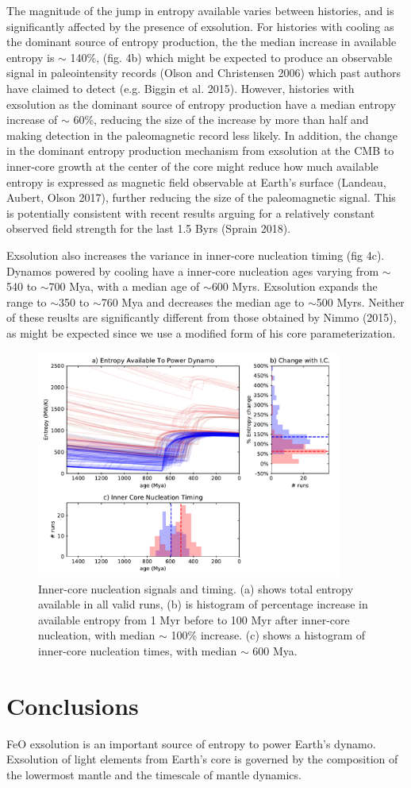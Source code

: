 \documentclass[]{article}
\begin{document}
	The magnitude of the jump in entropy available varies between histories, and is significantly affected by the presence of exsolution. For histories with cooling as the dominant source of entropy production, the the median increase in available entropy is $\sim$ 140\%, (fig. 4b) which might be expected to produce an observable signal in paleointensity records (Olson and Christensen 2006) which past authors have claimed to detect (e.g. Biggin et al. 2015). However, histories with exsolution as the dominant source of entropy production have a median entropy increase of $\sim$ 60\%, reducing the size of the increase by more than half and making detection in the paleomagnetic record less likely. In addition, the change in the dominant entropy production mechanism from exsolution at the CMB to inner-core growth at the center of the core might reduce how much available entropy is expressed as magnetic field observable at Earth's surface (Landeau, Aubert, Olson 2017), further reducing the size of the paleomagnetic signal. This is potentially consistent with recent results arguing for a relatively constant observed field strength for the last 1.5 Byrs (Sprain 2018). 
	
	Exsolution also increases the variance in inner-core nucleation timing (fig 4c). Dynamos powered by cooling have a inner-core nucleation ages varying from $\sim$540 to $\sim$700 Mya, with a median age of $\sim$600 Myrs. Exsolution expands the range to $\sim$350 to $\sim$760 Mya and decreases the median age to $\sim$500 Myrs. Neither of these reuslts are significantly different from those obtained by Nimmo (2015), as might be expected since we use a modified form of his core parameterization.
	
	\begin{figure}\centering
		\includegraphics[width=10cm]{./figures/figure4.pdf}
		\caption{Inner-core nucleation signals and timing. (a) shows total entropy available in all valid runs, (b) is histogram of percentage increase in available entropy from 1 Myr before to 100 Myr after inner-core nucleation, with median $\sim$ 100\% increase. (c) shows a histogram of inner-core nucleation times, with median $\sim$ 600 Mya.}
		\label{fig4}
	\end{figure}
		
	\section{Conclusions}\label{conclusions}
	FeO exsolution is an important source of entropy to power Earth's
	dynamo. Exsolution of light elements from Earth's core is governed by
	the composition of the lowermost mantle and the timescale of mantle dynamics.
	
	
	
\end{document}
